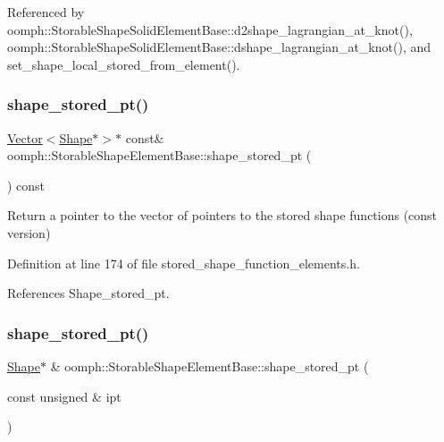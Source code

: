 Referenced by oomph\+::\+Storable\+Shape\+Solid\+Element\+Base\+::d2shape\+\_\+lagrangian\+\_\+at\+\_\+knot(), oomph\+::\+Storable\+Shape\+Solid\+Element\+Base\+::dshape\+\_\+lagrangian\+\_\+at\+\_\+knot(), and set\+\_\+shape\+\_\+local\+\_\+stored\+\_\+from\+\_\+element().

\mbox{\label{classoomph_1_1StorableShapeElementBase_a17084430eb55019882cde322f01874a3}} 
\subsubsection{\texorpdfstring{shape\+\_\+stored\+\_\+pt()}{shape\_stored\_pt()}\hspace{0.1cm}{\footnotesize\ttfamily [2/4]}}
{\footnotesize\ttfamily \hyperlink{classoomph_1_1Vector}{Vector}$<$\hyperlink{classoomph_1_1Shape}{Shape}$\ast$$>$$\ast$ const\& oomph\+::\+Storable\+Shape\+Element\+Base\+::shape\+\_\+stored\+\_\+pt (\begin{DoxyParamCaption}{ }\end{DoxyParamCaption}) const\hspace{0.3cm}{\ttfamily [inline]}}



Return a pointer to the vector of pointers to the stored shape functions (const version) 



Definition at line 174 of file stored\+\_\+shape\+\_\+function\+\_\+elements.\+h.



References Shape\+\_\+stored\+\_\+pt.

\mbox{\label{classoomph_1_1StorableShapeElementBase_ab5f825cab04717ff08220a6b1fb754a3}} 
\subsubsection{\texorpdfstring{shape\+\_\+stored\+\_\+pt()}{shape\_stored\_pt()}\hspace{0.1cm}{\footnotesize\ttfamily [3/4]}}
{\footnotesize\ttfamily \hyperlink{classoomph_1_1Shape}{Shape}$\ast$ \& oomph\+::\+Storable\+Shape\+Element\+Base\+::shape\+\_\+stored\+\_\+pt (\begin{DoxyParamCaption}\item[{const unsigned \&}]{ipt }\end{DoxyParamCaption})\hspace{0.3cm}{\ttfamily [inline]}}



